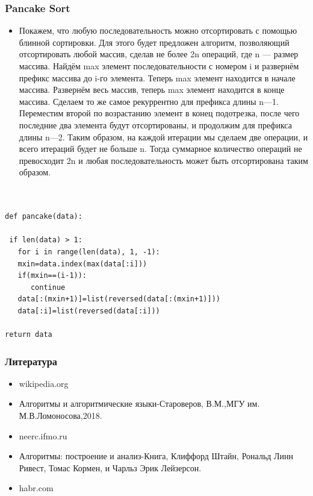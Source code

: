 \documentclass[t]{beamer}  %
\begin{document}
\begin{frame}[t]
	\frametitle{Pancake Sort}
	\begin{itemize}
		\item Покажем, что любую последовательность можно отсортировать с помощью блинной сортировки. Для этого будет предложен алгоритм, позволяющий отсортировать любой массив, сделав не более 2n операций, где n — размер массива. Найдём max элемент последовательности с номером i и развернём префикс массива до i-го элемента. Теперь max элемент находится в начале массива. Развернём весь массив, теперь max элемент находится в конце массива. Сделаем то же самое рекуррентно для префикса длины n—1. Переместим второй по возрастанию элемент в конец подотрезка, после чего последние два элемента будут отсортированы, и продолжим для префикса длины n—2. Таким образом, на каждой итерации мы сделаем две операции, и всего итераций будет не больше n. Тогда суммарное количество операций не превосходит 2n и любая последовательность может быть отсортирована таким образом.
		
	\end{itemize}
\end{frame}


\begin{lstlisting}[label=some-code,caption={Реализация на Python}]


def pancake(data):

 if len(data) > 1:
   for i in range(len(data), 1, -1):
   mxin=data.index(max(data[:i]))
   if(mxin==(i-1)):
      continue
   data[:(mxin+1)]=list(reversed(data[:(mxin+1)]))
   data[:i]=list(reversed(data[:i]))

return data

\end{lstlisting}

\begin{frame}[t]
	\frametitle{Литература}
	\begin{itemize}
\item wikipedia.org
\item Алгоритмы и алгоритмические языки-Староверов, В.М.,МГУ им. М.В.Ломоносова,2018.
\item neerc.ifmo.ru	
\item Алгоритмы: построение и анализ-Книга, Клиффорд Штайн, Рональд Линн Ривест, Томас Кормен, и Чарльз Эрик Лейзерсон.
\item habr.com		
	\end{itemize}
\end{frame}
\end{document}
